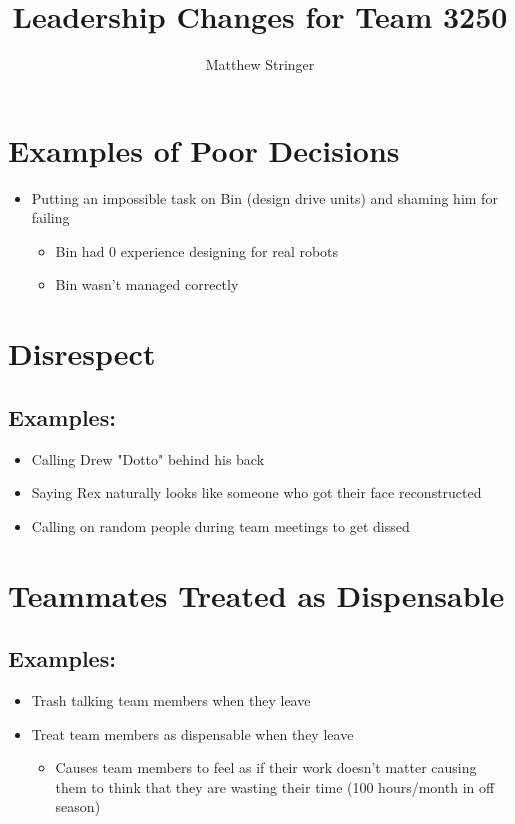 \documentclass[12pt]{article}
\title{Leadership Changes for Team 3250} %
\author{Matthew Stringer} %
\theoremstyle{break}
\numberwithin{theorem}{subsection}
\numberwithin{lemma}{subsection}
\numberwithin{corollary}{subsection}
\numberwithin{equation}{subsection}
\begin{document}
\maketitle

\section{Examples of Poor Decisions}
\begin{itemize}
	\item Putting an impossible task on Bin (design drive units) and shaming him for failing
	\begin{itemize}
		\item Bin had 0 experience designing for real robots
		\item Bin wasn't managed correctly
	\end{itemize}
\end{itemize}

\section{Disrespect}
\subsection{Examples: }
\begin{itemize}
	\item Calling Drew "Dotto" behind his back
	\item Saying Rex naturally looks like someone who got their face reconstructed
	\item Calling on random people during team meetings to get dissed
\end{itemize}

\section{Teammates Treated as Dispensable}
\subsection{Examples: }
\begin{itemize}
	\item Trash talking team members when they leave
	\item Treat team members as dispensable when they leave
	\begin{itemize}
		\item Causes team members to feel as if their work doesn't matter causing them to think that
			they are wasting their time (100 hours/month in off season)
	\end{itemize}
\end{itemize}
\end{document}
